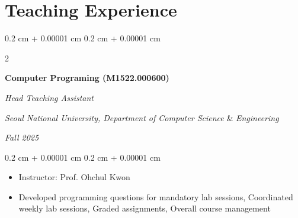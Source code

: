 \documentclass[10pt, letterpaper]{article}
\newenvironment{highlights}{
    \begin{itemize}[
        topsep=0.10 cm,
        parsep=0.10 cm,
        partopsep=0pt,
        itemsep=0pt,
        leftmargin=0.4 cm + 10pt
    ]
}{
    \end{itemize}
} %
\newenvironment{onecolentry}{
    \begin{adjustwidth}{
        0.2 cm + 0.00001 cm
    }{
        0.2 cm + 0.00001 cm
    }
}{
    \end{adjustwidth}
} %
\newenvironment{twocolentry}[2][]{
    \onecolentry
    \def\secondColumn{#2}
    \setcolumnwidth{\fill, 4.5 cm}
    \begin{paracol}{2}
}{
    \switchcolumn \raggedleft \secondColumn
    \end{paracol}
    \endonecolentry
} %
\begin{document}
        
            

         

    \section{Teaching Experience}

        \begin{twocolentry}{
        \textit{Fall 2025}}
            \textbf{Computer Programing (M1522.000600)}
            
            \textit{Head Teaching Assistant}
    
            \textit{Seoul National University,  Department of Computer Science} \& \textit{Engineering}
        \end{twocolentry}

        \vspace{0.10 cm}
        \begin{onecolentry}
            \begin{highlights}
                \item Instructor: Prof. Ohchul Kwon
                \item Developed programming questions for mandatory lab sessions, Coordinated weekly lab sessions, Graded assignments, Overall course management
            \end{highlights}
        \end{onecolentry}
    
        \vspace{0.3 cm}
            
\end{document}
